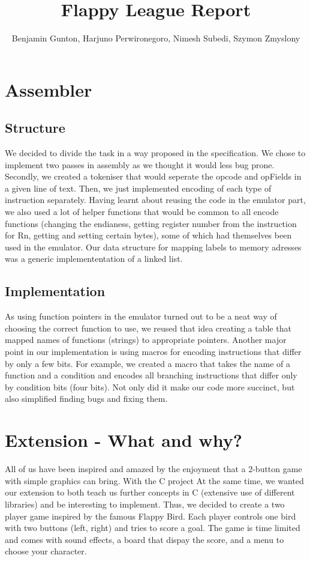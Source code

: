 \documentclass[11pt]{article}
\begin{document}
\title{Flappy League Report}
\author{Benjamin Gunton, Harjuno Perwironegoro, Nimesh Subedi, Szymon Zmyslony}

\maketitle
\section{Assembler}
\subsection{Structure}
 We decided to divide the task in a way proposed in the specification. We chose to implement two passes in assembly as we thought it would less bug prone. Secondly, we created a tokeniser that would seperate the opcode and opFields in a given line of text. Then, we just implemented encoding of each type of instruction separately. Having learnt about reusing the code in the emulator part, we also used a lot of helper functions that would be common to all encode functions (changing the endianess, getting register number from the instruction for Rn, getting and setting certain bytes), some of which had themselves been used in the emulator. Our data structure for mapping labels to memory adresses was a generic implemententation of a linked list. 
\subsection{Implementation}
As using function pointers in the emulator turned out to be a neat way of choosing the correct function to use, we reused that idea creating a table that mapped names of functions (strings) to appropriate pointers. Another major point in our implementation is using macros for encoding instructions that differ by only a few bits. For example, we created a macro that takes the name of a function and a condition and encodes all branching instructions that differ only by condition bits (four bits). Not only did it make our code more succinct, but also simplified finding bugs and fixing them.
\section{Extension - What and why?}
All of us have been inspired and amazed by the enjoyment that a 2-button game with simple graphics can bring. With the C project At the same time, we wanted our extension to both teach us further concepts in C (extensive use of different libraries) and be interesting to implement. Thus, we decided to create a two player game inspired by the famous Flappy Bird. Each player controls one bird with two buttons (left, right) and tries to score a goal. The game is time limited and comes with sound effects, a board that dispay the score, and a menu to choose your character.
\end{document}
